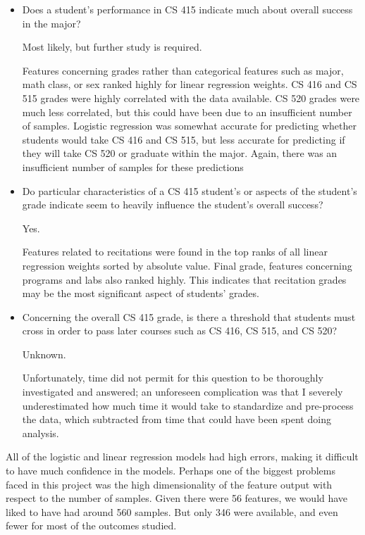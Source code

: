 \documentclass[letterpaper,11pt]{article}
\begin{document}
\begin{itemize}
\item Does a student's performance in CS 415 indicate much about overall success in the major?

Most likely, but further study is required.

Features concerning grades rather than categorical features such as major, math class, or sex ranked highly for linear regression weights.  CS 416 and CS 515 grades were highly correlated with the data available.  CS 520 grades were much less correlated, but this could have been due to an insufficient number of samples.  Logistic regression was somewhat accurate for predicting whether students would take CS 416 and CS 515, but less accurate for predicting if they will take CS 520 or graduate within the major.  Again, there was an insufficient number of samples for these predictions
\item Do particular characteristics of a CS 415 student's or aspects of the student's grade indicate seem to heavily influence the student's overall success?

Yes.

Features related to recitations were found in the top ranks of all linear regression weights sorted by absolute value.  Final grade, features concerning programs and labs also ranked highly.  This indicates that recitation grades may be the most significant aspect of students' grades.
\item Concerning the overall CS 415 grade, is there a threshold that students must cross in order to pass later courses such as CS 416, CS 515, and CS 520?

Unknown.

Unfortunately, time did not permit for this question to be thoroughly investigated and answered; an unforeseen complication was that I severely underestimated how much time it would take to standardize and pre-process the data, which subtracted from time that could have been spent doing analysis.
\end{itemize}

All of the logistic and linear regression models had high errors, making it difficult to have much confidence in the models.  Perhaps one of the biggest problems faced in this project was the high dimensionality of the feature output with respect to the number of samples.  Given there were 56 features, we would have liked to have had around 560 samples.  But only 346 were available, and even fewer for most of the outcomes studied.
\end{document}
